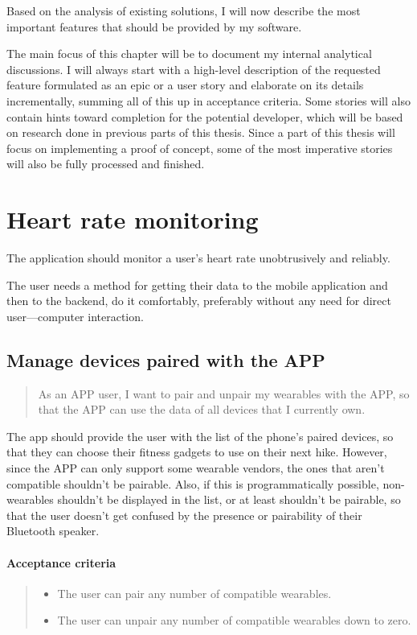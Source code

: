Based on the analysis of existing solutions, I will now describe the most important features that should be provided by my software.

The main focus of this chapter will be to document my internal analytical discussions.
I will always start with a high-level description of the requested feature formulated as an epic or a user story and elaborate on its details incrementally, summing all of this up in acceptance criteria.
Some stories will also contain hints toward completion for the potential developer, which will be based on research done in previous parts of this thesis.
Since a part of this thesis will focus on implementing a proof of concept, some of the most imperative stories will also be fully processed and finished.

\section{Heart rate monitoring}\label{epic:HRM}
The application should monitor a user's heart rate unobtrusively and reliably.

The user needs a method for getting their data to the mobile application and then to the backend, do it comfortably, preferably without any need for direct user---computer interaction.

\subsection{Manage devices paired with the APP}\label{US:HRM-device-management}
\begin{quote}
As an APP user, I want to pair and unpair my wearables with the APP, so that the APP can use the data of all devices that I currently own.
\end{quote}
The app should provide the user with the list of the phone's paired devices, so that they can choose their fitness gadgets to use on their next hike.
However, since the APP can only support some wearable vendors, the ones that aren't compatible shouldn't be pairable.
Also, if this is programmatically possible, non-wearables shouldn't be displayed in the list, or at least shouldn't be pairable,
so that the user doesn't get confused by the presence or pairability of their Bluetooth speaker.

\paragraph*{Acceptance criteria}
\begin{quote}
    \begin{itemize}
        \item The user can pair any number of compatible wearables.
        \item The user can unpair any number of compatible wearables down to zero.
    \end{itemize}
\end{quote}

